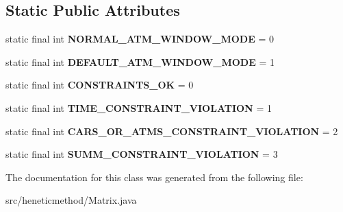 \subsection*{Static Public Attributes}
\begin{DoxyCompactItemize}
\item 
static final int {\bfseries N\+O\+R\+M\+A\+L\+\_\+\+A\+T\+M\+\_\+\+W\+I\+N\+D\+O\+W\+\_\+\+M\+O\+DE} = 0\hypertarget{classheneticmethod_1_1_matrix_aa5ee2049cbe94af4d59be64c91750aca}{}\label{classheneticmethod_1_1_matrix_aa5ee2049cbe94af4d59be64c91750aca}

\item 
static final int {\bfseries D\+E\+F\+A\+U\+L\+T\+\_\+\+A\+T\+M\+\_\+\+W\+I\+N\+D\+O\+W\+\_\+\+M\+O\+DE} = 1\hypertarget{classheneticmethod_1_1_matrix_af6837d2085494d2559514daa3bfb63dd}{}\label{classheneticmethod_1_1_matrix_af6837d2085494d2559514daa3bfb63dd}

\item 
static final int {\bfseries C\+O\+N\+S\+T\+R\+A\+I\+N\+T\+S\+\_\+\+OK} = 0\hypertarget{classheneticmethod_1_1_matrix_ac2ebbe8d17465d44f011556f23ccd38d}{}\label{classheneticmethod_1_1_matrix_ac2ebbe8d17465d44f011556f23ccd38d}

\item 
static final int {\bfseries T\+I\+M\+E\+\_\+\+C\+O\+N\+S\+T\+R\+A\+I\+N\+T\+\_\+\+V\+I\+O\+L\+A\+T\+I\+ON} = 1\hypertarget{classheneticmethod_1_1_matrix_acf2a47e036f5662e92968eec089139c0}{}\label{classheneticmethod_1_1_matrix_acf2a47e036f5662e92968eec089139c0}

\item 
static final int {\bfseries C\+A\+R\+S\+\_\+\+O\+R\+\_\+\+A\+T\+M\+S\+\_\+\+C\+O\+N\+S\+T\+R\+A\+I\+N\+T\+\_\+\+V\+I\+O\+L\+A\+T\+I\+ON} = 2\hypertarget{classheneticmethod_1_1_matrix_a792d16382dd5385978fe2de0dcdd14b6}{}\label{classheneticmethod_1_1_matrix_a792d16382dd5385978fe2de0dcdd14b6}

\item 
static final int {\bfseries S\+U\+M\+M\+\_\+\+C\+O\+N\+S\+T\+R\+A\+I\+N\+T\+\_\+\+V\+I\+O\+L\+A\+T\+I\+ON} = 3\hypertarget{classheneticmethod_1_1_matrix_af3471d2760d6bcedeea7bcaea8377f57}{}\label{classheneticmethod_1_1_matrix_af3471d2760d6bcedeea7bcaea8377f57}

\end{DoxyCompactItemize}


The documentation for this class was generated from the following file\+:\begin{DoxyCompactItemize}
\item 
src/heneticmethod/Matrix.\+java\end{DoxyCompactItemize}
